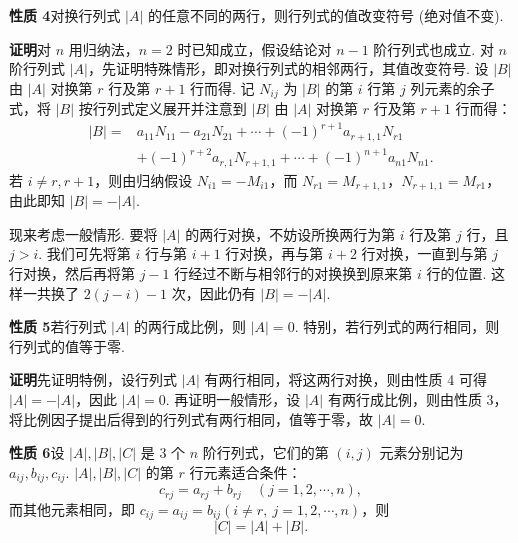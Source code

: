 \documentclass[UTF8, 12pt, fontset=fandol, oneside]{ctexart}
\begin{document}
\noindent\textbf{性质 4}\quad 对换行列式 $|A|$ 的任意不同的两行，则行列式的值改变符号 (绝对值不变).

\noindent\textbf{证明}\quad 对 $n$ 用归纳法，$n=2$ 时已知成立，假设结论对 $n-1$ 阶行列式也成立. 对 $n$ 阶行列式 $|A|$，先证明特殊情形，即对换行列式的相邻两行，其值改变符号. 设 $|B|$ 由 $|A|$ 对换第 $r$ 行及第 $r+1$ 行而得. 记 $N_{ij}$ 为 $|B|$ 的第 $i$ 行第 $j$ 列元素的余子式，将 $|B|$ 按行列式定义展开并注意到 $|B|$ 由 $|A|$ 对换第 $r$ 行及第 $r+1$ 行而得：
\[
\begin{aligned}
|B|={}&a_{11}N_{11}-a_{21}N_{21}+\cdots+(-1)^{r+1}a_{r+1,1}N_{r1}\\
&+(-1)^{r+2}a_{r,1}N_{r+1,1}+\cdots+(-1)^{n+1}a_{n1}N_{n1}.
\end{aligned}
\]
若 $i\ne r,r+1$，则由归纳假设 $N_{i1}=-M_{i1}$，而 $N_{r1}=M_{r+1,1}$，$N_{r+1,1}=M_{r1}$，由此即知 $|B|=-|A|$.

现来考虑一般情形. 要将 $|A|$ 的两行对换，不妨设所换两行为第 $i$ 行及第 $j$ 行，且 $j>i$. 我们可先将第 $i$ 行与第 $i+1$ 行对换，再与第 $i+2$ 行对换，一直到与第 $j$ 行对换，然后再将第 $j-1$ 行经过不断与相邻行的对换换到原来第 $i$ 行的位置. 这样一共换了 $2(j-i)-1$ 次，因此仍有 $|B|=-|A|$.

\noindent\textbf{性质 5}\quad 若行列式 $|A|$ 的两行成比例，则 $|A|=0$. 特别，若行列式的两行相同，则行列式的值等于零.

\noindent\textbf{证明}\quad 先证明特例，设行列式 $|A|$ 有两行相同，将这两行对换，则由性质 4 可得 $|A|=-|A|$，因此 $|A|=0$. 再证明一般情形，设 $|A|$ 有两行成比例，则由性质 3，将比例因子提出后得到的行列式有两行相同，值等于零，故 $|A|=0$.

\noindent\textbf{性质 6}\quad 设 $|A|,|B|,|C|$ 是 3 个 $n$ 阶行列式，它们的第 $(i,j)$ 元素分别记为 $a_{ij},b_{ij},c_{ij}$. $|A|,|B|,|C|$ 的第 $r$ 行元素适合条件：
\begin{equation}
c_{rj}=a_{rj}+b_{rj}\quad (j=1,2,\cdots,n),
\tag{1.3.6}
\end{equation}
而其他元素相同，即 $c_{ij}=a_{ij}=b_{ij}(i\ne r,\ j=1,2,\cdots,n)$，则
\[
|C|=|A|+|B|.
\]
\end{document}

